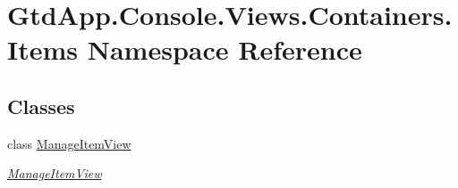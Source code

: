 \hypertarget{namespace_gtd_app_1_1_console_1_1_views_1_1_containers_1_1_items}{}\section{Gtd\+App.\+Console.\+Views.\+Containers.\+Items Namespace Reference}
\label{namespace_gtd_app_1_1_console_1_1_views_1_1_containers_1_1_items}
\subsection*{Classes}
\begin{DoxyCompactItemize}
\item 
class \mbox{\hyperlink{class_gtd_app_1_1_console_1_1_views_1_1_containers_1_1_items_1_1_manage_item_view}{Manage\+Item\+View}}
\begin{DoxyCompactList}\small\item\em \mbox{\hyperlink{class_gtd_app_1_1_console_1_1_views_1_1_containers_1_1_items_1_1_manage_item_view}{Manage\+Item\+View}} \end{DoxyCompactList}\end{DoxyCompactItemize}

